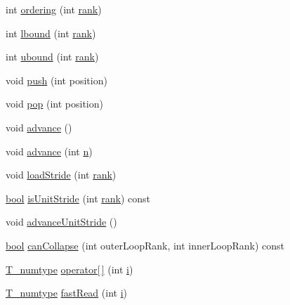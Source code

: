 \begin{DoxyCompactItemize}
int \hyperlink{class__bz__ArrayExprTernaryOp_a67c55c8d8a645c5bdee869acf0df4c84}{ordering} (int \hyperlink{class__bz__ArrayExprTernaryOp_afdb88cf98214c518580dcbc5ee7ad256}{rank})
\item 
int \hyperlink{class__bz__ArrayExprTernaryOp_a95e31537fd681a57713dfc1333334f80}{lbound} (int \hyperlink{class__bz__ArrayExprTernaryOp_afdb88cf98214c518580dcbc5ee7ad256}{rank})
\item 
int \hyperlink{class__bz__ArrayExprTernaryOp_a649dc3d093bf65fe5987d30bc06296ea}{ubound} (int \hyperlink{class__bz__ArrayExprTernaryOp_afdb88cf98214c518580dcbc5ee7ad256}{rank})
\item 
void \hyperlink{class__bz__ArrayExprTernaryOp_ad373f3db81ed40caab23d50bc34dd346}{push} (int position)
\item 
void \hyperlink{class__bz__ArrayExprTernaryOp_acf5781438b9836ee174667fca79b0027}{pop} (int position)
\item 
void \hyperlink{class__bz__ArrayExprTernaryOp_adc39057d1d7cc15425180682def3c436}{advance} ()
\item 
void \hyperlink{class__bz__ArrayExprTernaryOp_a91b72f0607357f7a9fb21a3048859051}{advance} (int \hyperlink{indexexpr_8h_ab427e2e2b4d6cec55fa088ea2a692ace}{n})
\item 
void \hyperlink{class__bz__ArrayExprTernaryOp_a123f21af62d64e054346b1d79519e8ad}{load\+Stride} (int \hyperlink{class__bz__ArrayExprTernaryOp_afdb88cf98214c518580dcbc5ee7ad256}{rank})
\item 
\hyperlink{compiler_8h_abb452686968e48b67397da5f97445f5b}{bool} \hyperlink{class__bz__ArrayExprTernaryOp_ad4a79a1cc09af29aefa4a4c0c02fa39b}{is\+Unit\+Stride} (int \hyperlink{class__bz__ArrayExprTernaryOp_afdb88cf98214c518580dcbc5ee7ad256}{rank}) const 
\item 
void \hyperlink{class__bz__ArrayExprTernaryOp_a420b87f25b2c8dbb6647be1d9ca03c41}{advance\+Unit\+Stride} ()
\item 
\hyperlink{compiler_8h_abb452686968e48b67397da5f97445f5b}{bool} \hyperlink{class__bz__ArrayExprTernaryOp_a1d5e338f1e83f6758f068378ddb22f01}{can\+Collapse} (int outer\+Loop\+Rank, int inner\+Loop\+Rank) const 
\item 
\hyperlink{class__bz__ArrayExprTernaryOp_a9a66d06520e4d8bedb6c754d3f106949}{T\+\_\+numtype} \hyperlink{class__bz__ArrayExprTernaryOp_a29de5b183a42cf97dfd6b62fac61c341}{operator\mbox{[}$\,$\mbox{]}} (int \hyperlink{indexexpr_8h_aabd77643995707c185e95c8cb2782c81}{i})
\item 
\hyperlink{class__bz__ArrayExprTernaryOp_a9a66d06520e4d8bedb6c754d3f106949}{T\+\_\+numtype} \hyperlink{class__bz__ArrayExprTernaryOp_a4eb69e079450b540aa3551a685df5923}{fast\+Read} (int \hyperlink{indexexpr_8h_aabd77643995707c185e95c8cb2782c81}{i})

\end{DoxyCompactItemize}
